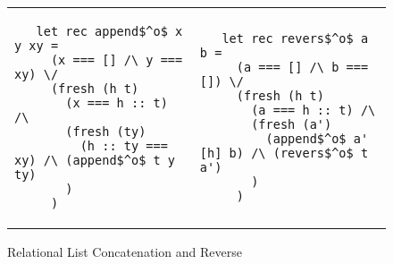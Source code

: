 \documentclass[preprint,numbers,10pt]{sigplanconf}
\begin{document}
\begin{figure*}
\centering
\begin{tabular}{p{8cm}p{8cm}}
\begin{lstlisting}
   let rec append$^o$ x y xy =
     (x === [] /\ y === xy) \/
     (fresh (h t)
       (x === h :: t) /\
       (fresh (ty)
         (h :: ty === xy) /\ (append$^o$ t y ty)
       )
     )
\end{lstlisting} &
\begin{lstlisting}
   let rec revers$^o$ a b =     
     (a === [] /\ b === []) \/
     (fresh (h t)
       (a === h :: t) /\
       (fresh (a')
         (append$^o$ a' [h] b) /\ (revers$^o$ t a')
       )
     )
\end{lstlisting}
\end{tabular}
\caption{Relational List Concatenation and Reverse}
\label{example}
\end{figure*}

\begin{comment}
\begin{figure*}
\centering
\begin{tabular}{|l|c|c|c|}
    \hline
    Query & List lenght & Unoptimized search & Optimized search \\
    \hline
    \multirow{5}{*}{Sorting}
        & 3  & 3                   & 11     \\ \cline{2-4}
        & 4  & 183               & 48     \\ \cline{2-4}
        & 5  & $> 300000$  & 107   \\ \cline{2-4}
        & 10 & $> 300000$ & 1399 \\ \cline{2-4}
        & 15 & $> 300000$ & 9226 \\ \hline
    \multirow{4}{*}{Permutations generation}
        & 2   & 3                  & 3       \\ \cline{2-4}
        & 3   & 18                & 11     \\ \cline{2-4}
        & 4   & $> 300000$ & 81     \\ \cline{2-4}
        & 6   & $> 300000$ & 1193 \\ \hline
\end{tabular}
\end{figure*}
\end{comment}
\end{document}
